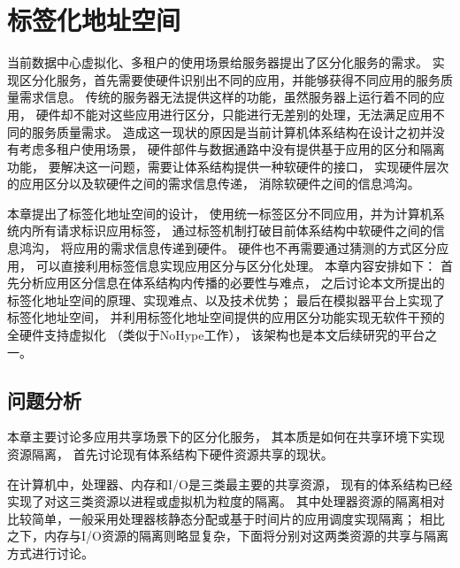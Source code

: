 

\chapter{标签化地址空间}
\label{chap:labeladdrspace}

当前数据中心虚拟化、多租户的使用场景给服务器提出了区分化服务的需求。
实现区分化服务，首先需要使硬件识别出不同的应用，并能够获得不同应用的服务质量需求信息。
传统的服务器无法提供这样的功能，虽然服务器上运行着不同的应用，
硬件却不能对这些应用进行区分，只能进行无差别的处理，无法满足应用不同的服务质量需求。
造成这一现状的原因是当前计算机体系结构在设计之初并没有考虑多租户使用场景，
硬件部件与数据通路中没有提供基于应用的区分和隔离功能，
要解决这一问题，需要让体系结构提供一种软硬件的接口，
实现硬件层次的应用区分以及软硬件之间的需求信息传递，
消除软硬件之间的信息鸿沟。

本章提出了标签化地址空间的设计，
使用统一标签区分不同应用，并为计算机系统内所有请求标识应用标签，
通过标签机制打破目前体系结构中软硬件之间的信息鸿沟，
将应用的需求信息传递到硬件。
硬件也不再需要通过猜测的方式区分应用，
可以直接利用标签信息实现应用区分与区分化处理。
本章内容安排如下：
首先分析应用区分信息在体系结构内传播的必要性与难点，
之后讨论本文所提出的标签化地址空间的原理、实现难点、以及技术优势； 
最后在模拟器平台上实现了标签化地址空间，
并利用标签化地址空间提供的应用区分功能实现无软件干预的全硬件支持虚拟化
（类似于NoHype工作\cite{keller_nohype:_2010}），
该架构也是本文后续研究的平台之一。

%
%
% 
%

\section{问题分析}

本章主要讨论多应用共享场景下的区分化服务，
其本质是如何在共享环境下实现资源隔离，
首先讨论现有体系结构下硬件资源共享的现状。

在计算机中，处理器、内存和I/O是三类最主要的共享资源，
现有的体系结构已经实现了对这三类资源以进程或虚拟机为粒度的隔离。
其中处理器资源的隔离相对比较简单，一般采用处理器核静态分配或基于时间片的应用调度实现隔离；
相比之下，内存与I/O资源的隔离则略显复杂，下面将分别对这两类资源的共享与隔离方式进行讨论。

